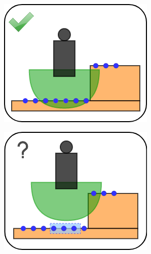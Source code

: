 \begin{figure}
    \captionsetup[subfigure]{justification=centering}
    \centering
    \begin{subfigure}[t]{.48\linewidth}
    \includegraphics[width=\textwidth]{Figures/Chapter_LEAS/approx0.png}
    \caption{\label{fig:approximation_validity_0}}
    \end{subfigure}
    \begin{subfigure}[t]{.48\linewidth}
    \includegraphics[width=\textwidth]{Figures/Chapter_LEAS/approx1.png}
    \caption{\label{fig:approximation_validity_1}}

\end{subfigure}
\end{figure}
